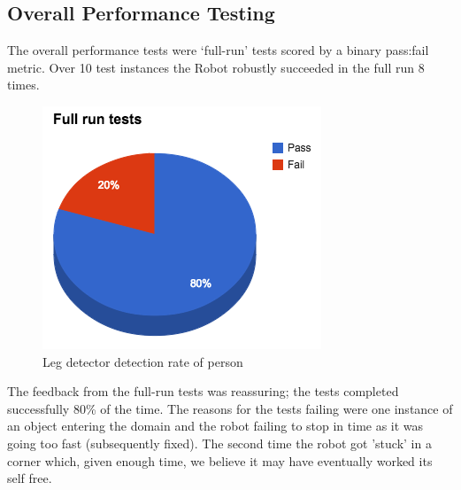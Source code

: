 \documentclass{article}
\begin{document}
\begin{multicols}{2}
	\subsection{Overall Performance Testing}
	The overall performance tests were ‘full-run’ tests scored by a binary pass:fail metric. Over 10 test instances the Robot robustly succeeded in the full run 8 times. 
	\begin{figure}[H]
	\begin{center}
	\includegraphics[width=0.8\linewidth]{ExperimentalResults13}
	\caption{Leg detector detection rate of person}
	\end{center}
	\end{figure}
	The feedback from the full-run tests was reassuring; the tests completed successfully 80\% of the time. The reasons for the tests failing were one instance of an object entering the domain and the robot failing to stop in time as it was going too fast (subsequently fixed). The second time the robot got 'stuck' in a corner which, given enough time, we believe it may have eventually worked its self free.
	\end{multicols}
\end{document}
